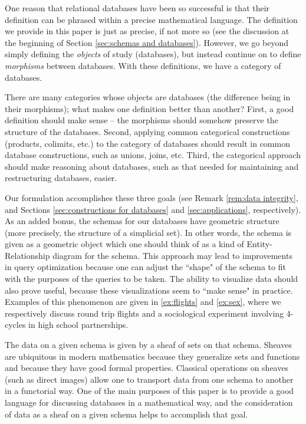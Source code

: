 \documentclass{amsart}
\begin{document}
One reason that relational databases have been so successful is that their definition can be phrased within a precise mathematical language.  The definition we provide in this paper is just as precise, if not more so (see the discussion at the beginning of Section \ref{sec:schemas and databases}).  However, we go beyond simply defining the {\em objects} of study (databases), but instead continue on to define {\em morphisms} between databases.  With these definitions, we have a category of databases.

There are many categories whose objects are databases (the difference being in their morphisms); what makes one definition better than another?  First, a good definition should make sense -- the morphisms should somehow preserve the structure of the databases.  Second, applying common categorical constructions (products, colimits, etc.) to the category of databases should result in common database constructions, such as unions, joins, etc.  Third, the categorical approach should make reasoning about databases, such as that needed for maintaining and restructuring databases, easier.  

Our formulation accomplishes these three goals (see Remark \ref{rem:data integrity}, and Sections \ref{sec:constructions for databases} and \ref{sec:applications}, respectively).  As an added bonus, the schemas for our databases have geometric structure (more precisely, the structure of a simplicial set).  In other words, the schema is given as a geometric object which one should think of as a kind of Entity-Relationship diagram for the schema.  This approach may lead to improvements in query optimization because one can adjust the ``shape" of the schema to fit with the purposes of the queries to be taken.  The ability to visualize data should also prove useful, because these visualizations seem to ``make sense" in practice.  Examples of this phenomenon are given in \ref{ex:flights} and \ref{ex:sex}, where we respectively discuss round trip flights and a sociological experiment involving 4-cycles in high school partnerships.

The data on a given schema is given by a sheaf of sets on that schema.  Sheaves are ubiquitous in modern mathematics because they generalize sets and functions and because they have good formal properties.  Classical operations on sheaves (such as direct images) allow one to transport data from one schema to another in a functorial way.  One of the main purposes of this paper is to provide a good language for discussing databases in a mathematical way, and the consideration of data as a sheaf on a given schema helps to accomplish that goal.
\end{document}
